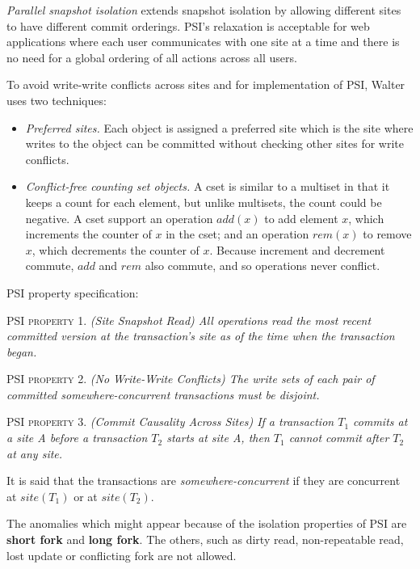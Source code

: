 \documentclass[a4paper]{article}
\begin{document}
\textit{Parallel snapshot isolation} extends snapshot isolation by allowing different sites to have different commit orderings. PSI's relaxation is acceptable for web applications where each user communicates with one site at a time and there is no need for a global ordering of all actions across all users. 

To avoid write-write conflicts across sites and for implementation of PSI, Walter uses two techniques:
\begin{itemize}
\item \textit{Preferred sites.} Each object is assigned a preferred site which is the site where writes to the object can be committed without checking other sites for write conflicts.
\item \textit{Conflict-free counting set objects.} A cset is similar to a multiset in that it keeps a count for each element, but unlike multisets, the count could be negative. A cset support an operation $add(x)$ to add element $x$, which increments the counter of $x$ in the cset; and an operation $rem(x)$ to remove $x$, which decrements the counter of $x$. Because increment and decrement commute, $add$ and $rem$ also commute, and so operations never conflict. 
\end{itemize}

PSI property specification:

PSI \textsc{property} 1. \textit{(Site Snapshot Read) All operations read the most recent committed version at the transaction's site as of the time when the transaction began.}

PSI \textsc{property} 2. \textit{(No Write-Write Conflicts) The write sets of each pair of committed somewhere-concurrent transactions must be disjoint.}

PSI \textsc{property} 3. \textit{(Commit Causality Across Sites) If a transaction $T_{1}$ commits at a site A before a transaction $T_{2}$ starts at site A, then $T_{1}$ cannot commit after $T_{2}$ at any site.}

It is said that the transactions are \textit{somewhere-concurrent} if they are concurrent at $site(T_{1})$ or at $site(T_{2})$.

The anomalies which might appear because of the isolation properties of PSI are \textbf{short fork} and \textbf{long fork}. The others, such as dirty read, non-repeatable read, lost update or conflicting fork are not allowed. 

\end{document}
